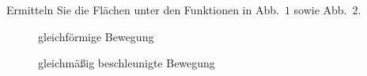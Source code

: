 


Ermitteln Sie die Flächen unter den Funktionen in Abb.~$1$ sowie Abb.~$2$.
\begin{figure}[h!]
	\begin{center}
		\def\svgwidth{0.3\textwidth}
		
		\caption{gleichförmige Bewegung}
	\end{center}
\end{figure}

\begin{figure}[h!]
	\begin{center}
		\def\svgwidth{0.3\textwidth}
		
		\caption{gleichmäßig beschleunigte Bewegung}
	\end{center}
\end{figure}

